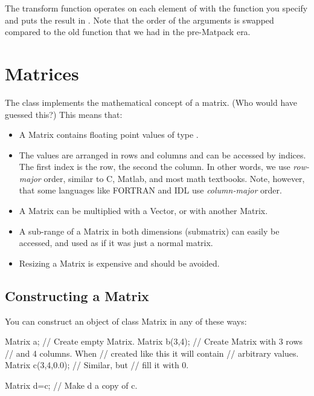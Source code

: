 The transform function operates on each element of  with the
function you specify and puts the result in . Note that the
order of the arguments is swapped compared to the old function
 that we had in the pre-Matpack era.


\section{Matrices}
\label{sec:matpack:matrices}

The class  implements the mathematical concept of a
matrix. (Who would have guessed this?) This means that:
\begin{itemize}
\item A Matrix contains floating point values of type .
\item The values are arranged in rows and columns and can be accessed
  by indices. The first index is the row, the second the column. In
  other words, we use \emph{row-major} order, similar to C, Matlab,
  and most math textbooks. Note, however, that some languages like
  FORTRAN and IDL use \emph{column-major} order.
\item A Matrix can be multiplied with a Vector, or with another
  Matrix.
\item A sub-range of a Matrix in both dimensions (submatrix) can
  easily be accessed, and used as if it was just a normal matrix.
\item Resizing a Matrix is expensive and should be avoided.
\end{itemize}

\subsection{Constructing a Matrix}
You can construct an object of class Matrix in any of these ways:

\begin{code}
Matrix a;          // Create empty Matrix.
Matrix b(3,4);     // Create Matrix with 3 rows
                   // and 4 columns. When
                   // created like this it will contain
                   // arbitrary values.
Matrix c(3,4,0.0); // Similar, but
                   // fill it with 0.

Matrix d=c;        // Make d a copy of c.
\end{code}

